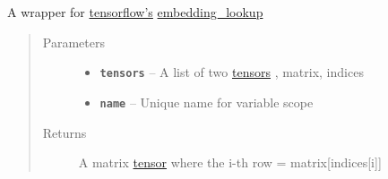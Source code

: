 \documentclass[letterpaper,10pt,english]{sphinxmanual}
\begin{document}

\begin{fulllineitems}
\label{node_ops:node_ops.embedding}
A wrapper for \href{https://www.tensorflow.org/}{tensorflow's} \href{https://www.tensorflow.org/versions/r0.7/api\_docs/python/nn.html\#embeddings}{embedding\_lookup}
\begin{quote}\begin{description}
\item[{Parameters}] \leavevmode\begin{itemize}
\item {} 
\textbf{\texttt{tensors}} -- A list of two \href{https://www.tensorflow.org/versions/r0.7/api\_docs/python/framework.html\#Tensor}{tensors} , matrix, indices

\item {} 
\textbf{\texttt{name}} -- Unique name for variable scope

\end{itemize}

\item[{Returns}] \leavevmode
A matrix \href{https://www.tensorflow.org/versions/r0.7/api\_docs/python/framework.html\#Tensor}{tensor} where the i-th row = matrix{[}indices{[}i{]}{]}

\end{description}\end{quote}

\end{fulllineitems}


\begin{fulllineitems}
\label{node_ops:node_ops.fan_scale}
\end{fulllineitems}


\begin{fulllineitems}
\label{node_ops:node_ops.fscore}
\end{fulllineitems}

\end{document}
